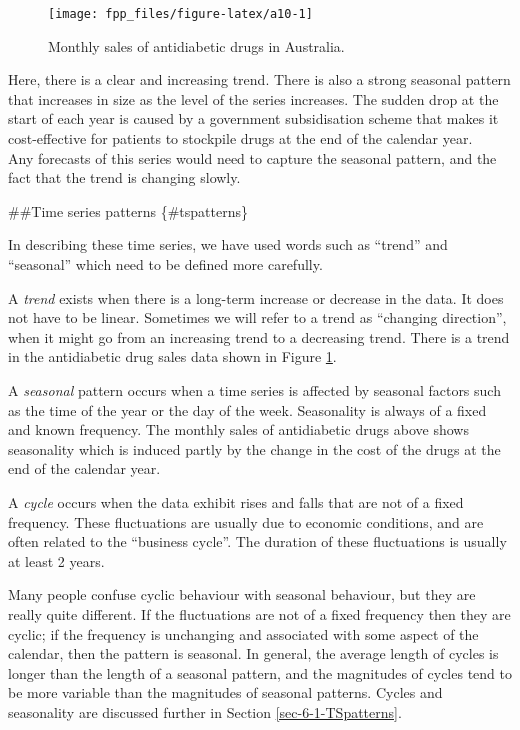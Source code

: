 \documentclass[]{book}
\providecommand{\tightlist}{%
  \setlength{\itemsep}{0pt}\setlength{\parskip}{0pt}}
\begin{document}
\begin{figure}

{\centering \texttt{[image: fpp\_files/figure-latex/a10-1]} 

}

\caption{Monthly sales of antidiabetic drugs in Australia.}\label{fig:a10}
\end{figure}

Here, there is a clear and increasing trend. There is also a strong seasonal pattern that increases in size as the level of the series increases. The sudden drop at the start of each year is caused by a government subsidisation scheme that makes it cost-effective for patients to stockpile drugs at the end of the calendar year.\\
Any forecasts of this series would need to capture the seasonal pattern, and the fact that the trend is changing slowly.

\#\#Time series patterns \{\#tspatterns\}

In describing these time series, we have used words such as ``trend'' and ``seasonal'' which need to be defined more carefully.

\begin{description}
\tightlist
\item[Trend]
A \emph{trend} exists when there is a long-term increase or decrease in the data. It does not have to be linear. Sometimes we will refer to a trend as ``changing direction'', when it might go from an increasing trend to a decreasing trend. There is a trend in the antidiabetic drug sales data shown in Figure \ref{fig:a10}.
\item[Seasonal]
A \emph{seasonal} pattern occurs when a time series is affected by seasonal factors such as the time of the year or the day of the week. Seasonality is always of a fixed and known frequency. The monthly sales of antidiabetic drugs above shows seasonality which is induced partly by the change in the cost of the drugs at the end of the calendar year.
\item[Cyclic]
A \emph{cycle} occurs when the data exhibit rises and falls that are not of a fixed frequency. These fluctuations are usually due to economic conditions, and are often related to the ``business cycle''. The duration of these fluctuations is usually at least 2 years.
\end{description}

Many people confuse cyclic behaviour with seasonal behaviour, but they are really quite different. If the fluctuations are not of a fixed frequency then they are cyclic; if the frequency is unchanging and associated with some aspect of the calendar, then the pattern is seasonal. In general, the average length of cycles is longer than the length of a seasonal pattern, and the magnitudes of cycles tend to be more variable than the magnitudes of seasonal patterns. Cycles and seasonality are discussed further in Section \ref{sec-6-1-TSpatterns}.
\end{document}
